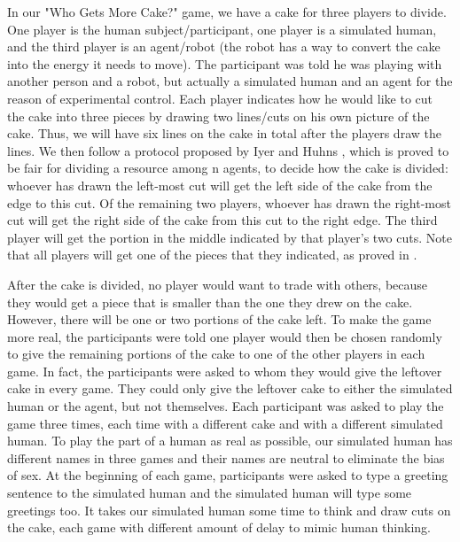 In our "Who Gets More Cake?" game, we have a cake for three players to divide. One player is the human subject/participant, one player is a simulated human, and the third player is an agent/robot (the robot has a way to convert the cake into the energy it needs to move). The participant was told he was playing with another person and a robot, but actually a simulated human and an agent for the reason of experimental control. Each player indicates how he would like to cut the cake into three pieces by drawing two lines/cuts on his own picture of the cake. Thus, we will have six lines on the cake in total after the players draw the lines. We then follow a protocol proposed by Iyer and Huhns \cite{Iyer2005}, which is proved to be fair for dividing a resource among n agents, to decide how the cake is divided: whoever has drawn the left-most cut will get the left side of the cake from the edge to this cut. Of the remaining two players, whoever has drawn the right-most cut will get the right side of the cake from this cut to the right edge. The third player will get the portion in the middle indicated by that player's two cuts. Note that all players will get one of the pieces that they indicated, as proved in  \cite{Iyer2005}. 

After the cake is divided, no player would want to trade with others, because they would get a piece that is smaller than the one they drew on the cake. However, there will be one or two portions of the cake left. To make the game more real, the participants were told one player would then be chosen randomly to give the remaining portions of the cake to one of the other players in each game. In fact, the participants were asked to whom they would give the leftover cake in every game. They could only give the leftover cake to either the simulated human or the agent, but not themselves. Each participant was asked to play the game three times, each time with a different cake and with a different simulated human. To play the part of a human as real as possible, our simulated human has different names in three games and their names are neutral to eliminate the bias of sex. At the beginning of each game, participants were asked to type a greeting sentence to the simulated human and the simulated human will type some greetings too. It takes our simulated human some time to think and draw cuts on the cake, each game with different amount of delay to mimic human thinking.


